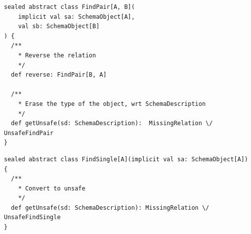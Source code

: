 \documentclass[12pt,a4paper,twoside,openright]{report}
\renewcommand{\baselinestretch}{1.1}    %
\begin{document}
\renewcommand{\baselinestretch}{0.8}
\begin{framed}
\begin{verbatim}
sealed abstract class FindPair[A, B](
    implicit val sa: SchemaObject[A],
    val sb: SchemaObject[B]
) {
  /**
    * Reverse the relation
    */
  def reverse: FindPair[B, A]

  /**
    * Erase the type of the object, wrt SchemaDescription
    */
  def getUnsafe(sd: SchemaDescription):  MissingRelation \/ UnsafeFindPair
}
\end{verbatim}
\end{framed}

\begin{framed}
\begin{verbatim}
sealed abstract class FindSingle[A](implicit val sa: SchemaObject[A]) {
  /**
    * Convert to unsafe
    */
  def getUnsafe(sd: SchemaDescription): MissingRelation \/ UnsafeFindSingle
}
\end{verbatim}
\end{framed}
\renewcommand{\baselinestretch}{1.1}
\end{document}
